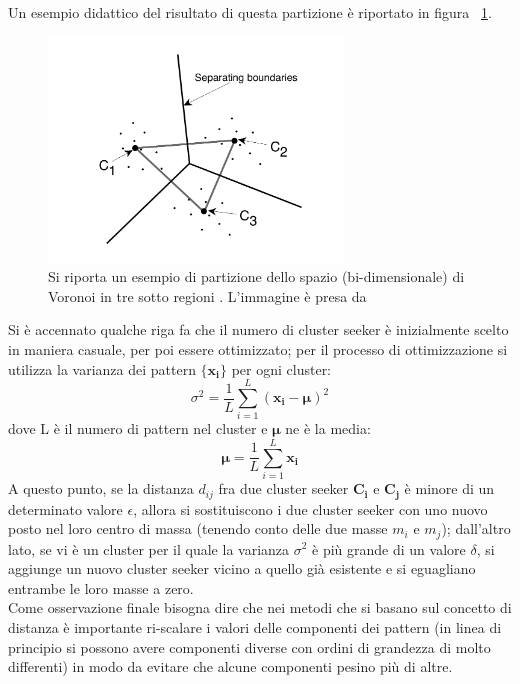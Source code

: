 Un esempio didattico del risultato di questa partizione è riportato in figura ~\ref{Voronoi}.
\begin{figure}[h!]
	\centering
	\includegraphics[width=0.70\textwidth]{figs/Voronoi.png}
	\caption{Si riporta un esempio di partizione dello spazio (bi-dimensionale) di Voronoi in tre sotto regioni . L'immagine è presa da \cite{IntroML}}
	\label{Voronoi}
\end{figure}

Si è accennato qualche riga fa che il numero di cluster seeker è inizialmente scelto in maniera casuale, per poi essere ottimizzato; per il processo di ottimizzazione si utilizza la varianza dei pattern $\{\textbf{x}_\textbf{i}\}$ per ogni cluster:
\begin{equation}
\sigma^2 = \frac{1}{L}\sum_{i=1}^{L} (\textbf{x}_\textbf{i} - \bm{\mu})^2
\end{equation}
dove L è il numero di pattern nel cluster e $\bm{\mu}$ ne è la media:
\begin{equation}
\bm{\mu} = \frac{1}{L}\sum_{i=1}^{L} \textbf{x}_\textbf{i}
\end{equation}
A questo punto, se la distanza $d_{ij}$ fra due cluster seeker $\textbf{C}_\textbf{i}$ e $\textbf{C}_\textbf{j}$ è minore di un determinato valore $\epsilon$, allora si sostituiscono i due cluster seeker con uno nuovo posto nel loro centro di massa (tenendo conto delle due masse $m_i$ e $m_j$); dall'altro lato, se vi è un cluster per il quale la varianza $\sigma^2$ è più grande di un valore $\delta$, si aggiunge un nuovo cluster seeker vicino a quello già esistente e si eguagliano entrambe le loro masse a zero.\\
Come osservazione finale bisogna dire che nei metodi che si basano sul concetto di distanza è importante ri-scalare i valori delle componenti dei pattern (in linea di principio si possono avere componenti diverse con ordini di grandezza di molto differenti) in modo da evitare che alcune componenti pesino più di altre. \\ 


